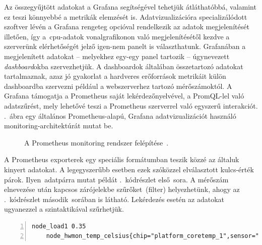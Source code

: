 Az összegyűjtött adatokat a Grafana segítségével tehetjük átláthatóbbá, valamint ez teszi könnyebbé a metrikák elemzését is. Adatvizualizációra specializálódott szoftver lévén a Grafana rengeteg opcióval rendelkezik az adatok megjelenítését illetően, így a~\acrshort{cpu}-adatok vonalgrafikonon való megjelenítésétől kezdve a szerverünk elérhetőségét jelző igen-nem panelt is választhatunk.
Grafanában a megjelenített adatokat -- melyekhez egy-egy panel tartozik -- úgynevezett \textit{dashboard}okba szervezhetjük. A dashboardok általában összetartozó adatokat tartalmaznak, azaz jó gyakorlat a hardveres erőforrások metrikáit külön dashboardba szervezni például a webszerverhez tartozó mérőszámoktól. %
A Grafana támogatja a Prometheus saját lekérdezőnyelvével, a PromQL-lel való adatszűrést, mely lehetővé teszi a Prometheus szerverrel való egyszerű interakciót.
.~ábra egy általános Prometheus-alapú, Grafana adatvizualizációt használó monitoring-architektúrát mutat be.

\vspace{0.25cm}
\begin{figure}[ht]
	\centering
	
	\caption{A Prometheus monitoring rendszer felépítése~\cite{PrometheusIntro}.}
	\label{fig:prometheus-architecture}
\end{figure}

A Prometheus exporterek egy speciális formátumban teszik közzé az általuk kinyert adatokat. A legegyszerűbb esetben ezek szóközzel elválasztott kulcs-érték párok. Ilyen~adatpárra mutat példát .~kódrészlet első~sora. A mérőszám elnevezése után kapcsos zárójelekbe szűrőket~(filter) helyezhetünk, ahogy az .~kódrészlet második~sorában is látható. Lekérdezés esetén az adatokat ugyanezzel a szintaktikával szűrhetjük.

\vspace{2mm}
\begin{lstlisting}[caption=Prometheus exporterek által közzétett adatok.,label=lst:prometheus-data-format, numbers=left]
	node_load1 0.35
	node_hwmon_temp_celsius{chip="platform_coretemp_1",sensor="temp2"} 28
\end{lstlisting}

